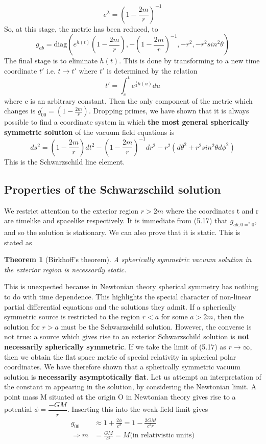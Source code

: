 \documentclass[12pt,a4paper]{article}
\numberwithin{table}{section}
\numberwithin{figure}{section}
\numberwithin{equation}{section}
\newtheorem{theorem}{Theorem}[section]
\theoremstyle{remark}
\theoremstyle{definition}
\begin{document}
$$e^{\lambda}=\left(1-\frac{2m}{r}\right)^{-1} $$
So, at this stage, the metric has been reduced, to
\begin{equation}
 g_{ab}=\text{diag}(e^{h(t)}\left(1-\frac{2m}{r}\right),-\left(1-\frac{2m}{r}\right)^{-1},-r^{2},-r^{2}sin^2\theta)
\end{equation}
The final stage is to eliminate $h(t)$. This is done by transforming to a new time coordinate $t'$ i.e. $t\rightarrow t'$ where $t'$ is determined by the relation
$$t'=\int^t_c e^{\frac{1}{2}h(u)}du$$
where c is an arbitrary constant. Then the only component of the metric which changes is $g^{'}_{00}=\left(1-\frac{2m}{r}\right)$. Dropping primes, we have shown that it is always possible to find a coordinate system in which \textbf{the most general spherically symmetric solution} of the vacuum field equations is
\begin{equation}
     ds^2=\left(1-\frac{2m}{r}\right)dt^2-\left(1-\frac{2m}{r}\right)^{-1}dr^2-r^{2}(d\theta^2+r^{2}sin^2\theta d\phi^2)
\end{equation}
This is the Schwarzschild line element. 
\subsection{Properties of the Schwarzschild solution }
We restrict attention to the exterior region $r>2m$ where the coordinates 
t and r are timelike and spacelike respectively. It is immediate from 
(5.17) that $g_{ab,0=^{*}0}$, and so the solution is stationary. We can also prove that it is static. This is stated as
\begin{theorem}[Birkhoff's theorem]
A spherically symmetric vacuum solution in the exterior region is necessarily static.
\end{theorem}
This is unexpected because in Newtonian theory spherical symmetry has 
nothing to do with time dependence. This highlights the special character of 
non-linear partial differential equations and the solutions they admit. If a spherically symmetric source is restricted to the region $r<a$ for some $a>2m$, then the solution for $r>a$ must be the Schwarzschild solution. However, the converse is not true: a source which gives rise to an exterior Schwarzschild solution is \textbf{not necessarily spherically symmetric}. If we take the limit of (5.17) as $r\rightarrow\infty$, then we obtain the flat space metric 
of special relativity in spherical polar coordinates. We have therefore shown that a spherically symmetric vacuum solution is \textbf{necessarily asymptotically flat}. 
Let us attempt an interpretation of the constant m appearing in the solution, by considering the Newtonian limit. A point mass M situated at the origin O in Newtonian theory gives rise to a potential $\phi=\dfrac{-GM}{r}$. Inserting this into the weak-field limit  gives
\begin{align*}
    g_{00}&\approx 1+\frac{2\phi}{c^2}=1-\frac{2GM}{c^2r}\\
    \Rightarrow m&=\frac{GM}{c^2}=M\text{(in relativistic units)}
\end{align*}
\end{document}

